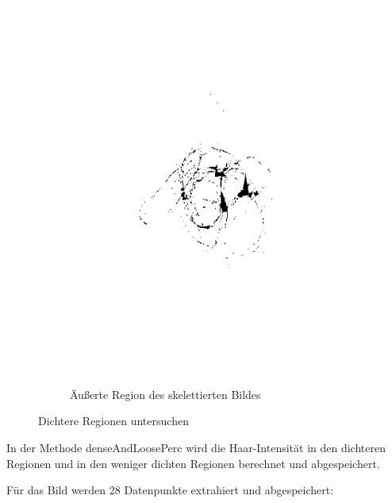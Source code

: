 \documentclass[german,a4paper, 12pt]{scrartcl}
\begin{document}
\begin{figure}
\begin{subfigure}[b]{0.475\textwidth}
		\includegraphics[width=\textwidth]{fig64/09outer section.png}
		\caption[]{Äußerte Region des skelettierten Bildes}
		\label{img:skel}
	\end{subfigure}
	\caption[  ]
	{\small Dichtere Regionen untersuchen} 
	\label{img:tstM}
\end{figure}

In der Methode denseAndLoosePerc wird die Haar-Intensität in den dichteren Regionen und in den weniger dichten Regionen berechnet und abgespeichert.

Für das Bild werden 28 Datenpunkte extrahiert und abgespeichert: 
\end{document}

